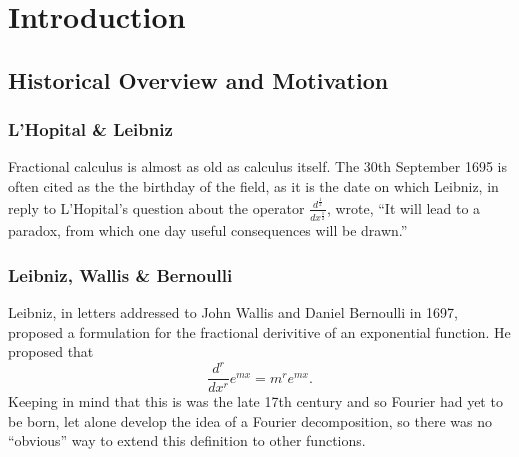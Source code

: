 \documentclass{unswmaths}
\begin{document}
\setlength\parindent{0pt}
\setlength{\parskip}{5mm plus4mm minus3mm}

\fancyfoot[r]{\today}

\section{Introduction}
\subsection{Historical Overview and Motivation}
\subsubsection{L'Hopital \& Leibniz}
Fractional calculus is almost as old as calculus itself. The 30th September 1695 is often cited as the the birthday of the field,
as it is the date on which Leibniz, in reply to L'Hopital's question about the operator $ \frac{d^\frac{1}{2}}{dx^\frac{1}{2}} $, 
wrote, ``It will lead to a paradox, from which one day useful consequences will be drawn.''
\subsubsection{Leibniz, Wallis \& Bernoulli}
Leibniz, in letters addressed to John Wallis and Daniel Bernoulli in 1697, proposed a 
formulation for the fractional derivitive of an exponential function.
He proposed that 
$$
    \frac{d^r}{dx^r} e^{mx} = m^r e^{mx}.
$$
Keeping in mind that this is was the late 17th century and so Fourier had yet to 
be born, let alone develop the idea of a Fourier decomposition, so there was
no ``obvious'' way to extend this definition to other functions.
\end{document}
